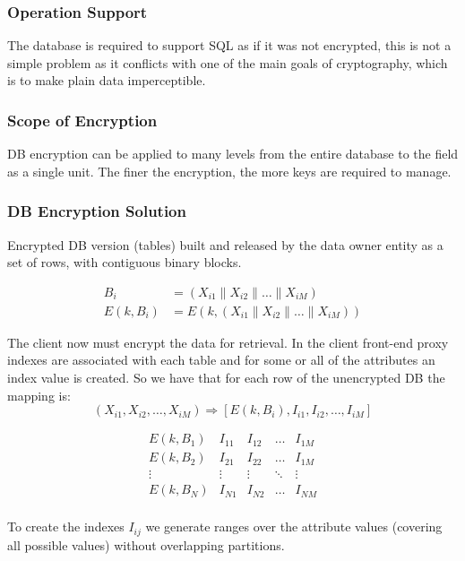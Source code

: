 \subsubsection{Operation Support}
The database is required to support SQL as if it was not encrypted,
this is not a simple problem as it conflicts with one of the main goals of cryptography,
which is to make plain data imperceptible.

\subsubsection{Scope of Encryption}
DB encryption can be applied to many levels from the entire database to the field as a single unit.
The finer the encryption, the more keys are required to manage.

\subsubsection{DB Encryption Solution}
Encrypted DB version (tables) built and released by the data owner entity as a set of rows,
with contiguous binary blocks.

\begin{equation*}
    \begin{split}
        B_i & = (X_{i1} \parallel X_{i2} \parallel \dots \parallel X_{iM}) \\
        E(k, B_i) & = E(k, (X_{i1} \parallel X_{i2} \parallel \dots \parallel X_{iM}))
    \end{split}
\end{equation*}

The client now must encrypt the data for retrieval.
In the client front-end proxy indexes are associated with each table and for some or all of the attributes an index value is created.
So we have that for each row of the unencrypted DB the mapping is:
\begin{equation*}
    (X_{i1}, X_{i2}, \dots, X_{iM}) \Rightarrow [E(k, B_i), I_{i1}, I_{i2}, \dots, I_{iM}]
\end{equation*}

\begin{equation*}
    \begin{matrix}
        E(k, B_1) & I_{11} & I_{12} & \dots  & I_{1M} \\
        E(k, B_2) & I_{21} & I_{22} & \dots  & I_{1M} \\
        \vdots    & \vdots & \vdots & \ddots & \vdots \\
        E(k, B_N) & I_{N1} & I_{N2} & \dots  & I_{NM} \\
    \end{matrix}
\end{equation*}

To create the indexes $I_{ij}$ we generate ranges over the attribute values (covering all possible values) without overlapping partitions.